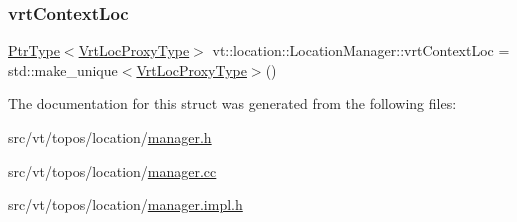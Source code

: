 \subsubsection{\texorpdfstring{vrt\+Context\+Loc}{vrtContextLoc}}
{\footnotesize\ttfamily \hyperlink{structvt_1_1location_1_1_location_manager_a32d8bca6ed6909a2190286408335d3b4}{Ptr\+Type}$<$\hyperlink{structvt_1_1location_1_1_location_manager_a3e410c85f5790a526a4eda22a9cc7881}{Vrt\+Loc\+Proxy\+Type}$>$ vt\+::location\+::\+Location\+Manager\+::vrt\+Context\+Loc = std\+::make\+\_\+unique$<$\hyperlink{structvt_1_1location_1_1_location_manager_a3e410c85f5790a526a4eda22a9cc7881}{Vrt\+Loc\+Proxy\+Type}$>$()}



The documentation for this struct was generated from the following files\+:\begin{DoxyCompactItemize}
\item 
src/vt/topos/location/\hyperlink{topos_2location_2manager_8h}{manager.\+h}\item 
src/vt/topos/location/\hyperlink{topos_2location_2manager_8cc}{manager.\+cc}\item 
src/vt/topos/location/\hyperlink{topos_2location_2manager_8impl_8h}{manager.\+impl.\+h}\end{DoxyCompactItemize}
